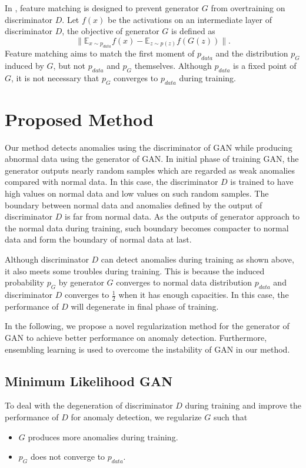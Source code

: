 \documentclass[a4paper,conference]{IEEEtran}
\begin{document}
In \cite{salimans2016}, feature matching is designed to prevent generator $G$ from overtraining on  discriminator $D$.  Let $f(x)$ be the activations on an intermediate layer of discriminator $D$, the objective of generator $G$ is defined as \[\| \mathbb{E}_{x\sim p_{data}}f(x) - \mathbb{E}_{z\sim p(z)}f(G(z))\|.\] Feature matching aims to match the first moment of $p_{data}$ and the distribution $p_G$ induced by $G$, but not $p_{data}$ and $p_G$ themselves. Although $p_{data}$ is a fixed point of $G$, it is not necessary that $p_G$ converges to $p_{data}$ during training.




\section{Proposed Method}
   Our method detects anomalies using the discriminator of GAN while producing  abnormal data using the generator of GAN. In initial phase of  training GAN, the generator outputs nearly random samples which are regarded as weak anomalies compared with normal data. In this case, the discriminator $D$ is trained to have high values on normal data and low values on such random samples. The boundary between normal data and anomalies defined by the output of  discriminator $D$ is far from normal data. As the  outputs of generator approach to the  normal data during training, such boundary becomes compacter to normal data and form the boundary of normal data at last.


Although  discriminator $D$  can detect anomalies during training as shown above, it also meets some troubles during training. This is because the induced probability $p_G$ by generator $G$  converges to normal data distribution $p_{data}$ and discriminator $D$ converges to $\frac{1}{2}$ when it has enough capacities. In this case, the performance of $D$ will degenerate in final phase of training.

In the following, we propose a novel regularization method for the generator of GAN to achieve better performance on anomaly detection. Furthermore, ensembling learning is used to overcome the instability of GAN in our method.









\subsection{Minimum Likelihood GAN}
 To deal with the degeneration of discriminator $D$ during training and improve the performance of $D$ for anomaly detection, we regularize $G$ such that
\begin{itemize}
\item $G$  produces more anomalies during training.
\item $p_G$  does not converge to $p_{data}$.
\end{itemize}
\end{document}
